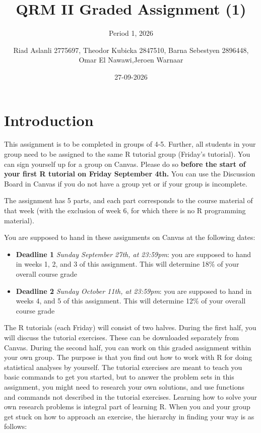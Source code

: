 \documentclass[
]{article}
\title{QRM II Graded Assignment (1)}
\subtitle{Period 1, 2026}
\author{Riad Aslanli 2775697, Theodor Kubicka 2847510, Barna Sebestyen
2896448, Omar El Nawawi,Jeroen Warnaar}
\date{27-09-2026}
\providecommand{\tightlist}{%
  \setlength{\itemsep}{0pt}\setlength{\parskip}{0pt}}
\begin{document}
\maketitle

\section{Introduction}\label{introduction}

This assignment is to be completed in groups of 4-5. Further, all
students in your group need to be assigned to the same R tutorial group
(Friday's tutorial). You can sign yourself up for a group on Canvas.
Please do so
\textbf{before the start of your first R tutorial on Friday September 4th.}
You can use the Discussion Board in Canvas if you do not have a group
yet or if your group is incomplete.

The assignment has 5 parts, and each part corresponds to the course
material of that week (with the exclusion of week 6, for which there is
no R programming material).

You are supposed to hand in these assignments on Canvas at the following
dates:

\begin{itemize}
\tightlist
\item
  \textbf{Deadline 1} \emph{Sunday September 27th, at 23:59pm}: you are
  supposed to hand in weeks 1, 2, and 3 of this assignment. This will
  determine 18\% of your overall course grade
\item
  \textbf{Deadline 2} \emph{Sunday October 11th, at 23:59pm}: you are
  supposed to hand in weeks 4, and 5 of this assignment. This will
  determine 12\% of your overall course grade
\end{itemize}

The R tutorials (each Friday) will consist of two halves. During the
first half, you will discuss the tutorial exercises. These can be
downloaded separately from Canvas. During the second half, you can work
on this graded assignment within your own group. The purpose is that you
find out how to work with R for doing statistical analyses by yourself.
The tutorial exercises are meant to teach you basic commands to get you
started, but to answer the problem sets in this assignment, you might
need to research your own solutions, and use functions and commands not
described in the tutorial exercises. Learning how to solve your own
research problems is integral part of learning R. When you and your
group get stuck on how to approach an exercise, the hierarchy in finding
your way is as follows:
\end{document}
